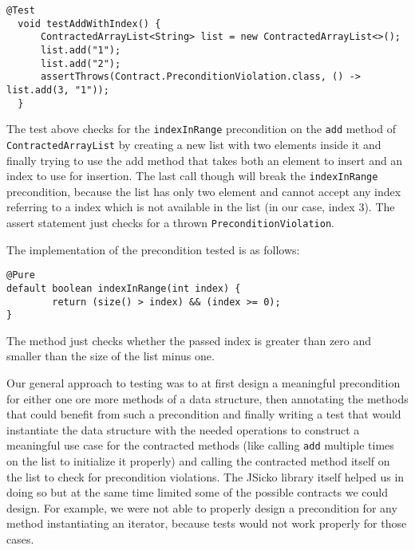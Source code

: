 \documentclass[a4paper]{article}
\begin{document}
\begin{lstlisting}
@Test
  void testAddWithIndex() {
      ContractedArrayList<String> list = new ContractedArrayList<>();
      list.add("1");
      list.add("2");
      assertThrows(Contract.PreconditionViolation.class, () -> list.add(3, "1"));
  }
\end{lstlisting}

The test above checks for the \lstinline{indexInRange} precondition on the \lstinline{add} method of \lstinline{ContractedArrayList} by creating a new list with two elements inside it and finally trying to use the add method that takes both an element to insert and an index to use for insertion. The last call though will break the \lstinline{indexInRange} precondition, because the list has only two element and cannot accept any index referring to a index which is not available in the list (in our case, index 3). The assert statement just checks for a thrown \lstinline{PreconditionViolation}.

The implementation of the precondition tested is as follows:

\begin{lstlisting}
@Pure
default boolean indexInRange(int index) {
		return (size() > index) && (index >= 0);
}
\end{lstlisting}

The method just checks whether the passed index is greater than zero and smaller than the size of the list minus one.

Our general approach to testing was to at first design a meaningful precondition for either one ore more methods of a data structure, then annotating the methods that could benefit from such a precondition and finally writing a test that would instantiate the data structure with the needed operations to construct a meaningful use case for the contracted methods (like calling \lstinline{add} multiple times on the list to initialize it properly) and calling the contracted method itself on the list to check for precondition violations. The JSicko library itself helped us in doing so but at the same time limited some of the possible contracts we could design. For example, we were not able to properly design a precondition for any method instantiating an iterator, because tests would not work properly for those cases.
\end{document}
